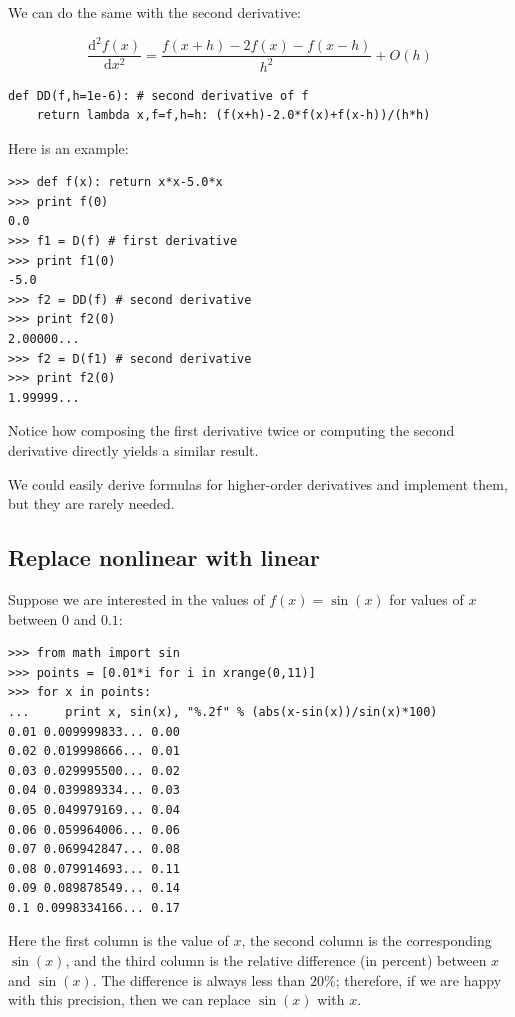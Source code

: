 \documentclass[justified,sixbynine]{tufte-book}
\def\ft{\small\tt}
\theoremstyle{plain}%
\theoremstyle{definition}
\theoremstyle{remark}
\begin{document}
\begin{fullwidth}
We can do the same with the second derivative:

\begin{equation}
  \frac{\textrm{d}^2f(x)}{\textrm{d}x^2} = \frac{f(x+h)-2f(x)-f(x-h)}{h^2} + O(h)
\end{equation}

\begin{lstlisting}[caption={in file: {\ft nlib.py}}]
def DD(f,h=1e-6): # second derivative of f
    return lambda x,f=f,h=h: (f(x+h)-2.0*f(x)+f(x-h))/(h*h)
\end{lstlisting}

Here is an example:

\begin{lstlisting}[caption={in file: {\ft nlib.py}}]
>>> def f(x): return x*x-5.0*x
>>> print f(0)
0.0
>>> f1 = D(f) # first derivative
>>> print f1(0)
-5.0
>>> f2 = DD(f) # second derivative
>>> print f2(0)
2.00000...
>>> f2 = D(f1) # second derivative
>>> print f2(0)
1.99999...
\end{lstlisting}

Notice how composing the first derivative twice or computing the second derivative directly yields a similar result.

We could easily derive formulas for higher-order derivatives and implement them, but they are rarely needed.

\goodbreak\subsection{Replace nonlinear with linear}


Suppose we are interested in the values of $f(x)=\sin(x)$ for values of $x$ between $0$ and $0.1$:

\begin{lstlisting}
>>> from math import sin
>>> points = [0.01*i for i in xrange(0,11)]
>>> for x in points:
...     print x, sin(x), "%.2f" % (abs(x-sin(x))/sin(x)*100)
0.01 0.009999833... 0.00
0.02 0.019998666... 0.01
0.03 0.029995500... 0.02
0.04 0.039989334... 0.03
0.05 0.049979169... 0.04
0.06 0.059964006... 0.06
0.07 0.069942847... 0.08
0.08 0.079914693... 0.11
0.09 0.089878549... 0.14
0.1 0.0998334166... 0.17
\end{lstlisting}
Here the first column is the value of $x$, the second column is the corresponding $\sin(x)$, and the third column is the relative difference (in percent) between $x$ and $\sin(x)$. The difference is always less than $20\%$; therefore, if we are happy with this precision, then we can replace $\sin(x)$ with $x$.


\end{fullwidth}
\end{document}
